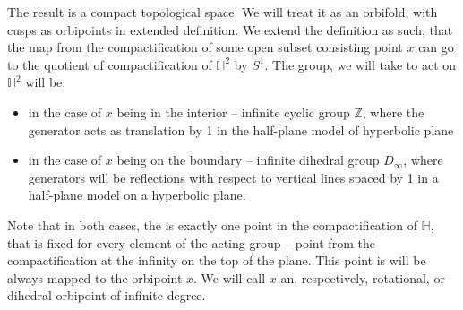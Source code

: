 The result is a compact topological space. We will treat it as an orbifold, with 
cusps as orbipoints in extended definition. 
We extend the definition as such, that the map from the compactification of 
some open subset consisting point $x$ can go to the quotient of compactification of 
$\mathbb{H}^2$ by $S^1$. The group, we will take to act on $\mathbb{H}^2$ will 
be:
\begin{itemize} 
\item in the case of $x$ being in the interior -- infinite cyclic group $\mathbb{Z}$, 
where the generator acts as translation by 1 
in the half-plane model of hyperbolic plane   
\item in the case of $x$ being on the boundary -- infinite dihedral group $D_\infty$, where 
generators will be reflections with respect to vertical lines spaced by 1 in a half-plane 
model on a hyperbolic plane.
\end{itemize}

Note that in both cases, the is exactly one point in the compactification of $\mathbb{H}$, that is 
fixed for every element of the acting group -- point from the compactification at 
the infinity on the top of the plane. This point is will be always mapped to the orbipoint $x$. 
We will call $x$ an, respectively, rotational, or dihedral orbipoint of infinite degree.



